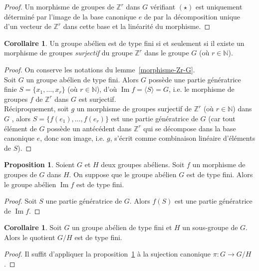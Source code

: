 \documentclass{article}
\newcommand{\Z}{\mathbb{Z}}
\newcommand{\N}{\mathbb{N}}
\newcommand{\im}{\mathop{\mathrm{Im}}\nolimits}
\theoremstyle{definition}
\newtheorem{prop}[defi]{Proposition}
\newtheorem{coro}[defi]{Corollaire}
\theoremstyle{remark}
\begin{document}
\begin{proof}
Un morphisme de groupes de $\Z^r$ dans $G$ vérifiant $(\star)$ est uniquement déterminé par l'image de la base canonique $e$ de par la décomposition unique d'un vecteur de $\Z^r$ dans cette base et la linéarité du morphisme.
\end{proof}

\begin{coro}\label{type-fini-et-Zr}
Un groupe abélien est de type fini si et seulement si il existe un morphisme de groupes \textit{surjectif} du groupe $\Z^r$ dans le groupe $G$ (où $r \in \N$).
\end{coro}

\begin{proof}
On conserve les notations du lemme~\ref{morphisme-Zr-G}. \\
Soit $G$ un groupe abélien de type fini. Alors $G$ possède une partie génératrice finie $S=\{x_1, \ldots, x_r \}$ (où $r \in \N$), d'où $\im f=\langle S\rangle=G$,
i.e. le morphisme de groupes $f$ de $\Z^r$ dans $G$ est surjectif. \\
Réciproquement, soit $g$ un morphisme de groupes surjectif de $\Z^r$ (où $r \in \N$) dans $G$ , alors $S=\{f(e_1), \ldots, f(e_r) \}$ est une partie génératrice de $G$ (car tout élément de $G$ possède un antécédent dans $\Z^r$ qui se décompose dans la base canonique $e$, donc son image, i.e. $g$, s'écrit comme combinaison linéaire d'éléments de $S$). 
\end{proof}

\begin{prop}\label{image-type-fini}
Soient $G$ et $H$ deux groupes abéliens. Soit $f$ un morphisme de groupes de $G$ dans $H$. On suppose que le groupe abélien $G$ est de type fini. Alors le groupe abélien $\im f$ est de type fini.
\end{prop}

\begin{proof}
Soit $S$ une partie génératrice de $G$. Alors $f(S)$ est une partie génératrice de $\im f$.
\end{proof}

\begin{coro}
Soit $G$ un groupe ab\'elien de type fini et $H$ un sous-groupe de $G$. Alors le quotient $G/H$ est de type fini.
\end{coro}

\begin{proof}
Il suffit d'appliquer la proposition~\ref{image-type-fini} \`a la sujection canonique $\pi:G\to G/H$.
\end{proof}
\end{document}
